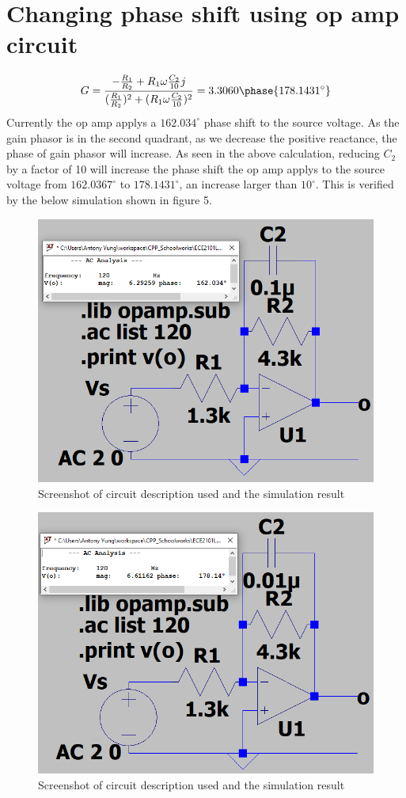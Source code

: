 \documentclass{article}
\begin{document}
\section{Changing phase shift using op amp circuit}
$$G=\frac{-\frac{R_1}{R_2}+R_1\omega \frac{C_2}{10}j}{(\frac{R_1}{R_2})^2+(R_1\omega \frac{C_2}{10})^2}=3.3060\phase{178.1431^{\circ}}$$
Currently the op amp applys a $162.034^{\circ}$ phase shift to the source voltage. As the gain phasor is in the second quadrant, as we decrease the positive reactance, the phase of gain phasor will increase. As seen in the above calculation, reducing $C_2$ by a factor of 10 will increase the phase shift the op amp applys to the source voltage from $162.0367^{\circ}$ to $178.1431^{\circ}$, an increase larger than $10^{\circ}$. This is verified by the below simulation shown in figure 5.
\begin{figure}[H]
    \centering
        \includegraphics[scale=0.55]{ECE2101L_Lab08_B2.png}
        \caption{Screenshot of circuit description used and the simulation result}
\end{figure}
\begin{figure}[H]
    \centering
        \includegraphics[scale=0.55]{ECE2101L_Lab08_B3.png}
        \caption{Screenshot of circuit description used and the simulation result}
\end{figure}
\end{document}
